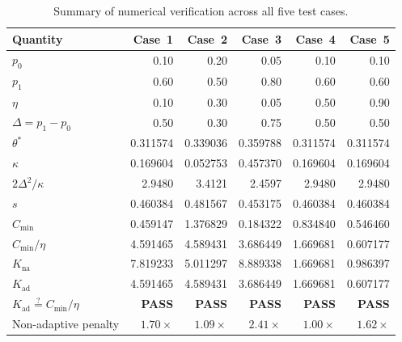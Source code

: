 \begin{table}[htbp]
\centering
\caption{Summary of numerical verification across all five test cases.}
\label{tab:summary}
\begin{tabular}{lrrrrr}
\toprule
Quantity & Case~1 & Case~2 & Case~3 & Case~4 & Case~5 \\
\midrule
$p_0$ & 0.10 & 0.20 & 0.05 & 0.10 & 0.10 \\
$p_1$ & 0.60 & 0.50 & 0.80 & 0.60 & 0.60 \\
$\eta$ & 0.10 & 0.30 & 0.05 & 0.50 & 0.90 \\
$\Delta = p_1 - p_0$ & 0.50 & 0.30 & 0.75 & 0.50 & 0.50 \\
$\theta^*$ & 0.311574 & 0.339036 & 0.359788 & 0.311574 & 0.311574 \\
$\kappa$ & 0.169604 & 0.052753 & 0.457370 & 0.169604 & 0.169604 \\
$2\Delta^2 / \kappa$ & 2.9480 & 3.4121 & 2.4597 & 2.9480 & 2.9480 \\
$s$ & 0.460384 & 0.481567 & 0.453175 & 0.460384 & 0.460384 \\
$C_{\min}$ & 0.459147 & 1.376829 & 0.184322 & 0.834840 & 0.546460 \\
$C_{\min}/\eta$ & 4.591465 & 4.589431 & 3.686449 & 1.669681 & 0.607177 \\
$K_{\mathrm{na}}$ & 7.819233 & 5.011297 & 8.889338 & 1.669681 & 0.986397 \\
$K_{\mathrm{ad}}$ & 4.591465 & 4.589431 & 3.686449 & 1.669681 & 0.607177 \\
$K_{\mathrm{ad}} \stackrel{?}{=} C_{\min}/\eta$ & \textbf{PASS} & \textbf{PASS} & \textbf{PASS} & \textbf{PASS} & \textbf{PASS} \\
Non-adaptive penalty & $1.70\times$ & $1.09\times$ & $2.41\times$ & $1.00\times$ & $1.62\times$ \\
\bottomrule
\end{tabular}
\end{table}

